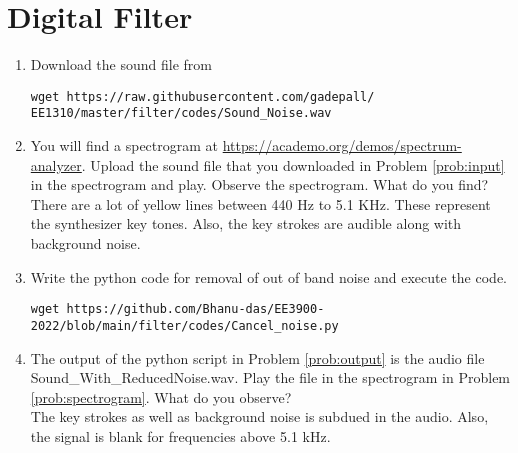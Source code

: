 \documentclass[journal,12pt,twocolumn]{IEEEtran}
\renewcommand\thesection{\arabic{section}}
\begin{document}
\section{Digital Filter}
\begin{enumerate}[label=\thesection.\arabic*
,ref=\thesection.\theenumi]
\item
\label{prob:input}
Download the sound file from  
\begin{lstlisting}
wget https://raw.githubusercontent.com/gadepall/ 
EE1310/master/filter/codes/Sound_Noise.wav
\end{lstlisting}
\item
\label{prob:spectrogram}
You will find a spectrogram at \href{https://academo.org/demos/spectrum-analyzer}{\url{https://academo.org/demos/spectrum-analyzer}}. 
%
Upload the sound file that you downloaded in Problem \ref{prob:input} in the spectrogram  and play.  Observe the spectrogram. What do you find?
\\
%
\solution There are a lot of yellow lines between 440 Hz to 5.1 KHz.  These represent the synthesizer key tones. Also, the key strokes
are audible along with background noise.
\item
\label{prob:output}
Write the python code for removal of out of band noise and execute the code.
\\
\solution
\begin{lstlisting}
wget https://github.com/Bhanu-das/EE3900-2022/blob/main/filter/codes/Cancel_noise.py
\end{lstlisting}
%
\item
The output of the python script in Problem \ref{prob:output} is the audio file Sound\_With\_ReducedNoise.wav. Play the file in the spectrogram in Problem \ref{prob:spectrogram}. What do you observe?
\\
\solution The key strokes as well as background noise is subdued in the audio.  Also,  the signal is blank for frequencies above 5.1 kHz.

\end{enumerate}
\end{document}
